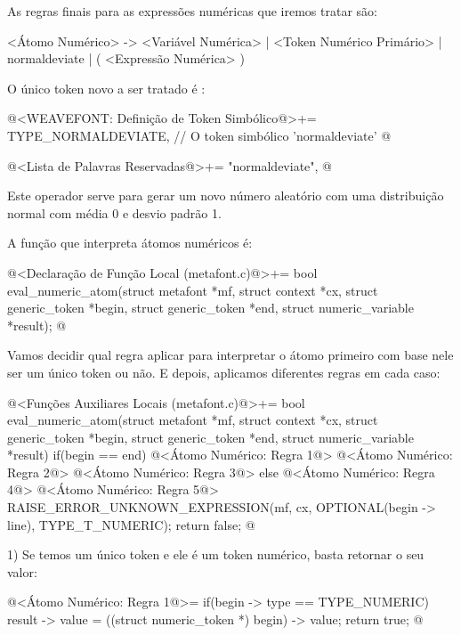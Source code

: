 
As regras finais para as expressões numéricas que iremos tratar são:

\alinhaverbatim
<Átomo Numérico> -> <Variável Numérica> |
                    <Token Numérico Primário> |
                    normaldeviate |
                    ( <Expressão Numérica> )
\alinhanormal

O único token novo a ser tratado é :

\iniciocodigo
@<WEAVEFONT: Definição de Token Simbólico@>+=
TYPE_NORMALDEVIATE,  // O token simbólico 'normaldeviate'
@
\fimcodigo

\iniciocodigo
@<Lista de Palavras Reservadas@>+=
"normaldeviate",
@
\fimcodigo

Este operador serve para gerar um novo número aleatório com uma
distribuição normal com média 0 e desvio padrão 1.

A função que interpreta átomos numéricos é:

\iniciocodigo
@<Declaração de Função Local (metafont.c)@>+=
bool eval_numeric_atom(struct metafont *mf, struct context *cx,
                       struct generic_token *begin,
                       struct generic_token *end,
                       struct numeric_variable *result);
@
\fimcodigo

Vamos decidir qual regra aplicar para interpretar o átomo primeiro com
base nele ser um único token ou não. E depois, aplicamos diferentes
regras em cada caso:

\iniciocodigo
@<Funções Auxiliares Locais (metafont.c)@>+=
bool eval_numeric_atom(struct metafont *mf, struct context *cx,
                       struct generic_token *begin,
                       struct generic_token *end,
                       struct numeric_variable *result){
  if(begin == end){
    @<Átomo Numérico: Regra 1@>
    @<Átomo Numérico: Regra 2@>
    @<Átomo Numérico: Regra 3@>
  }
  else{
    @<Átomo Numérico: Regra 4@>
    @<Átomo Numérico: Regra 5@>
  }
  RAISE_ERROR_UNKNOWN_EXPRESSION(mf, cx, OPTIONAL(begin -> line),
                                 TYPE_T_NUMERIC);
  return false;
}
@

1) Se temos um único token e ele é um token numérico, basta retornar o
seu valor:

\iniciocodigo
@<Átomo Numérico: Regra 1@>=
if(begin -> type == TYPE_NUMERIC){
  result -> value = ((struct numeric_token *) begin) -> value;
  return true;
}
@
\fimcodigo

